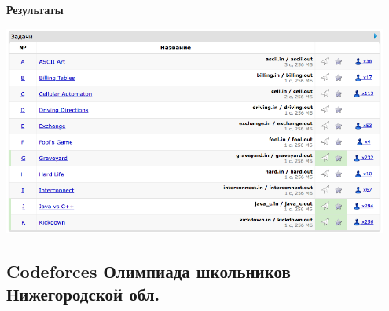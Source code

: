 \documentclass[a4paper,12pt]{article}
\begin{document}
\textbf{{\large Результаты}} \\
\begin{center}
\includegraphics[width=0.95\textwidth]{CT_S02E09/CT_S02E09_result.png}\\ [1cm]
\end{center}



%
%
\newpage
\subsection{Codeforces Олимпиада школьников Нижегородской обл.}
\end{document}

